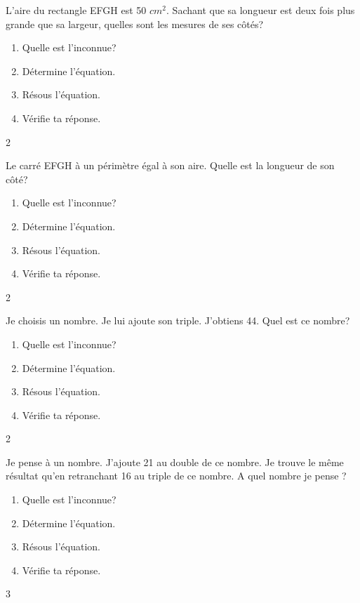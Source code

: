 \documentclass[a4paper,11pt]{report}
\begin{document}
\begin{exo}
{L'aire du rectangle EFGH est 50 $cm^2$. Sachant que sa longueur est deux fois plus grande que sa largeur, quelles sont les mesures de ses côtés?
\begin{enumerate}
    \item Quelle est l'inconnue?
    \item Détermine l'équation.
    \item Résous l'équation.
    \item Vérifie ta réponse.
\end{enumerate}}
  {2}
\end{exo}

\begin{exo}
{Le carré EFGH à un périmètre égal à son aire. Quelle est la longueur de son côté?
\begin{enumerate}
    \item Quelle est l'inconnue?
    \item Détermine l'équation.
    \item Résous l'équation.
    \item Vérifie ta réponse.
\end{enumerate}}
 {2}
\end{exo}

\begin{exo}
{ Je choisis un nombre. Je lui ajoute son triple. J'obtiens 44. Quel est ce nombre?\begin{enumerate}
    \item Quelle est l'inconnue?
    \item Détermine l'équation.
    \item Résous l'équation.
    \item Vérifie ta réponse.
\end{enumerate}}
{2}
\end{exo}

\begin{exo}
{ Je pense à un nombre. J’ajoute 21 au double de ce nombre. Je trouve le même résultat qu’en retranchant 16 au triple de ce nombre. A quel nombre je pense ?
\begin{enumerate}
    \item Quelle est l'inconnue?
    \item Détermine l'équation.
    \item Résous l'équation.
    \item Vérifie ta réponse.
\end{enumerate}}
{3}
\end{exo}
\end{document}
